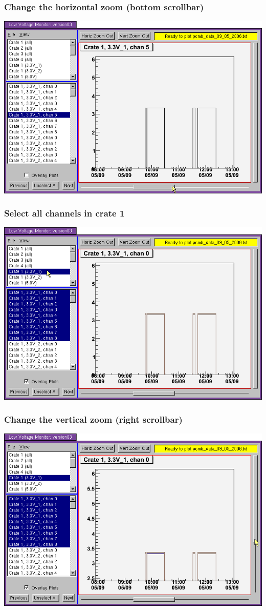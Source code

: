 \documentclass[12pt,compress]{beamer}
\begin{document}
\begin{frame}
\frametitle{Change the horizontal zoom (bottom scrollbar)}
\begin{center}
\includegraphics[width=0.9\linewidth]{06.png}
\end{center}
\end{frame}

\begin{frame}
\frametitle{Select all channels in crate 1}
\begin{center}
\includegraphics[width=0.9\linewidth]{07.png}
\end{center}
\end{frame}

\begin{frame}
\frametitle{Change the vertical zoom (right scrollbar)}
\begin{center}
\includegraphics[width=0.9\linewidth]{08.png}
\end{center}
\end{frame}
\end{document}
